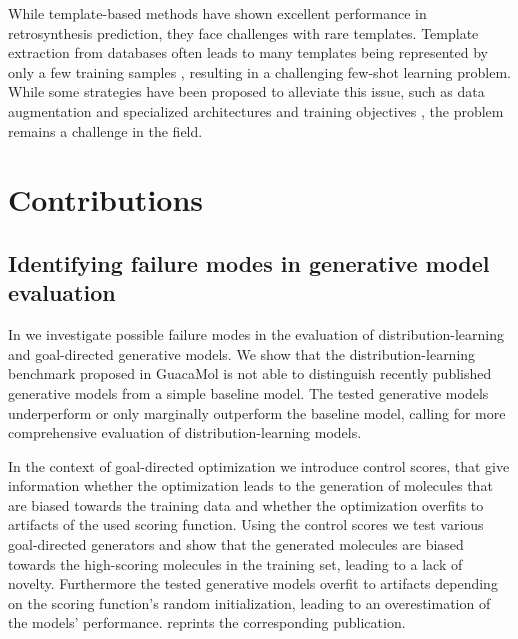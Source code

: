 While template-based methods have shown excellent performance in retrosynthesis prediction, they
face challenges with rare templates. Template extraction from databases often leads to many
templates being represented by only a few training samples
\citep{fortunatoDataAugmentationPretraining2020}, resulting in a challenging few-shot learning
problem. While some strategies have been proposed to alleviate this issue, such as data augmentation
\citep{fortunatoDataAugmentationPretraining2020} and specialized architectures and training
objectives \citep{daiRetrosynthesisPredictionConditional2020}, the problem remains a challenge in
the field.

\section{Contributions\label{sec:contributions}}
\subsection{Identifying failure modes in generative model evaluation}
In \citep{renzFailureModesMolecule2019} we investigate possible failure modes in the evaluation of
distribution-learning and goal-directed generative models. We show that the distribution-learning
benchmark proposed in GuacaMol \citep{brownGuacaMolBenchmarkingModels2019} is not able to
distinguish recently published generative models from a simple baseline model. The tested generative
models underperform or only marginally outperform the baseline model, calling for more comprehensive
evaluation of distribution-learning models.

In the context of goal-directed optimization we introduce control scores, that give information
whether the optimization leads to the generation of molecules that are biased towards the training
data and whether the optimization overfits to artifacts of the used scoring function. Using the
control scores we test various goal-directed generators and show that the generated molecules are
biased towards the high-scoring molecules in the training set, leading to a lack of novelty.
Furthermore the tested generative models overfit to artifacts depending on the scoring function's
random initialization, leading to an overestimation of the models' performance.
 reprints the corresponding publication.

